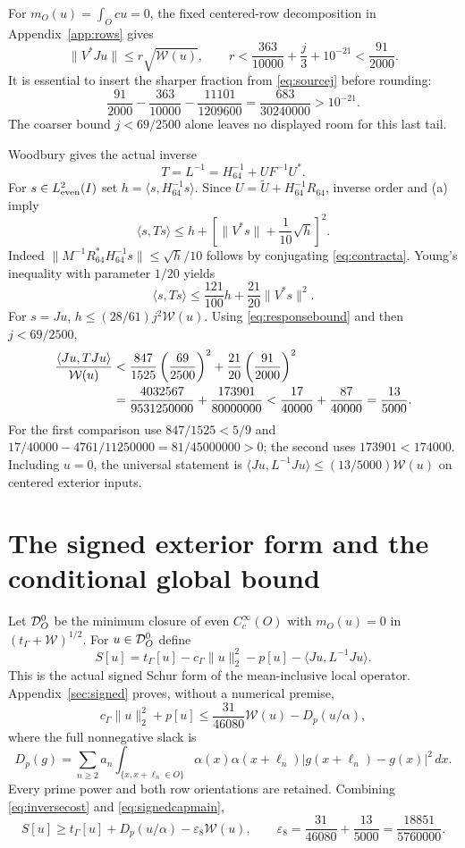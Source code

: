 \documentclass[11pt,a4paper]{article}
\numberwithin{equation}{section}
\theoremstyle{remark}\newtheorem{remark}[theorem]{Remark}
\newcommand{\tg}{t_\Gamma}\newcommand{\cg}{c_\Gamma}
\newcommand{\norm}[1]{\lVert#1\rVert}\newcommand{\abs}[1]{\lvert#1\rvert}
\newcommand{\ip}[2]{\langle#1,#2\rangle}\newcommand{\dd}{\mathop{}\!\mathrm d}
\newcommand{\wo}{\mathcal W}\newcommand{\HS}{\mathrm{HS}}
\begin{document}
For $m_O(u)=\int_Ocu=0$, the fixed centered-row decomposition in Appendix~\ref{app:rows} gives
\begin{equation}\label{eq:responsebound}
 \norm{V^*Ju}\le r\sqrt{\wo(u)},\qquad
 r<\frac{363}{10000}+\frac j3+10^{-21}<\frac{91}{2000}.
\end{equation}
It is essential to insert the sharper fraction from \eqref{eq:sourcej} before rounding:
\[
 \frac{91}{2000}-\frac{363}{10000}-\frac{11101}{1209600}
 =\frac{683}{30240000}>10^{-21}.
\]
The coarser bound $j<69/2500$ alone leaves no displayed room for this last tail.

Woodbury gives the actual inverse
\[
 T=L^{-1}=H_{64}^{-1}+UF^{-1}U^*.
\]
For $s\in L^2_{\rm even}(I)$ set $h=\ip s{H_{64}^{-1}s}$.
Since $U=\widetilde U+H_{64}^{-1}R_{64}$, inverse order and (a) imply
\[
 \ip s{Ts}\le h+
 \left[\norm{V^*s}+\frac1{10}\sqrt h\right]^2.
\]
Indeed
$\norm{M^{-1}R_{64}^*H_{64}^{-1}s}\le\sqrt h/10$
follows by conjugating \eqref{eq:contracta}.
Young's inequality with parameter $1/20$ yields
\[
 \ip s{Ts}\le\frac{121}{100}h+\frac{21}{20}\norm{V^*s}^2.
\]
For $s=Ju$, $h\le(28/61)j^2\wo(u)$.
Using \eqref{eq:responsebound} and then $j<69/2500$,
\begin{align}
 \frac{\ip{Ju}{TJu}}{\wo(u)}
 &<\frac{847}{1525}\left(\frac{69}{2500}\right)^2
 +\frac{21}{20}\left(\frac{91}{2000}\right)^2\notag\\
 &=\frac{4032567}{9531250000}+\frac{173901}{80000000}
 <\frac{17}{40000}+\frac{87}{40000}=\frac{13}{5000}.\label{eq:inversecost}
\end{align}
For the first comparison use $847/1525<5/9$ and
$17/40000-4761/11250000=81/45000000>0$; the second uses $173901<174000$.
Including $u=0$, the universal statement is
$\ip{Ju}{L^{-1}Ju}\le(13/5000)\wo(u)$ on centered exterior inputs.

\section{The signed exterior form and the conditional global bound}\label{sec:conditionalproof}
Let $\mathcal D_O^0$ be the minimum closure of even $C_c^\infty(O)$ with
$m_O(u)=0$ in $(\tg+\wo)^{1/2}$.
For $u\in\mathcal D_O^0$ define
\[
 S[u]=\tg[u]-\cg\norm u_2^2-p[u]-\ip{Ju}{L^{-1}Ju}.
\]
This is the actual signed Schur form of the mean-inclusive local operator.
Appendix~\ref{sec:signed} proves, without a numerical premise,
\begin{equation}\label{eq:signedcapmain}
 \cg\norm u_2^2+p[u]\le\frac{31}{46080}\wo(u)-D_p(u/\alpha),
\end{equation}
where the full nonnegative slack is
\[
 D_p(g)=\sum_{n\ge2}a_n\int_{\{x,x+\ell_n\in O\}}
  \alpha(x)\alpha(x+\ell_n)|g(x+\ell_n)-g(x)|^2\,dx.
\]
Every prime power and both row orientations are retained.
Combining \eqref{eq:inversecost} and \eqref{eq:signedcapmain},
\begin{equation}\label{eq:Slower}
 S[u]\ge\tg[u]+D_p(u/\alpha)-\varepsilon_8\wo(u),\qquad
 \varepsilon_8=\frac{31}{46080}+\frac{13}{5000}
 =\frac{18851}{5760000}.
\end{equation}
\end{document}
